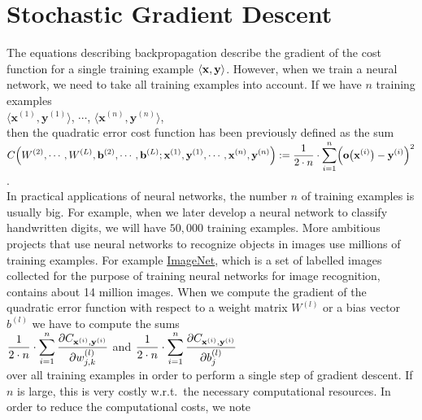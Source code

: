\section{Stochastic Gradient Descent}
The equations describing backpropagation describe the gradient of the cost function for a single training
example $\pair(\mathbf{x}, \mathbf{y})$.  However, when we train a neural network, we need to take all training
examples into account.  If we have $n$ training examples
\\[0.2cm]
\hspace*{1.3cm}
$\langle\mathbf{x}^{(1)}, \mathbf{y}^{(1)}\rangle$,
$\cdots$,
$\langle\mathbf{x}^{(n)}, \mathbf{y}^{(n)}\rangle$,
\\[0.2cm]
then the quadratic error cost function has been previously defined as the sum
\\[0.2cm]
\hspace*{1.3cm}
$\displaystyle C\Bigr(W^{(2)}, \cdots, W^{(L)}, \mathbf{b}^{(2)}, \cdots, \mathbf{b}^{(L)};
     \mathbf{x}^{(1)}, \mathbf{y}^{(1)}, \cdots, \mathbf{x}^{(n)},\mathbf{y}^{(n)} \Bigr) := 
 \frac{1}{2 \cdot n} \cdot \sum\limits_{i=1}^n \Bigl(\mathbf{o}\bigl(\mathbf{x}^{(i)}\bigr) - \mathbf{y}^{(i)}\Bigr)^2
$.
\\[0.2cm]
In practical applications of neural networks, the number $n$ of training examples is usually big.  For example, 
when we later develop a neural network to classify handwritten digits, we will have $50,000$ training examples.  More
ambitious projects that use neural networks to recognize objects in images use millions of training examples.
For example \href{https://www.image-net.org/download.php}{ImageNet}, which is a set of labelled images
collected for the purpose of training neural networks for image recognition, contains about 14 million images.
When we compute the gradient of the quadratic error function with respect to a weight matrix $W^{(l)}$ or a
bias vector $b^{(l)}$ we have to compute the sums 
\\[0.2cm]
\hspace*{0.3cm}
$\displaystyle \frac{1}{2\cdot n} \cdot \sum\limits_{i=1}^n \frac{\partial C_{\mathbf{x}^{(i)}, \mathbf{y}^{(i)}}}{\partial w_{j,k}^{(l)}}$
\quad and \quad
$\displaystyle \frac{1}{2\cdot n} \cdot \sum\limits_{i=1}^n \frac{\partial C_{\mathbf{x}^{(i)}, \mathbf{y}^{(i)}}}{\partial b_{j}^{(l)}}$
\\[0.2cm]
over all training examples in order to perform a single step of gradient descent.  If $n$ is large, this is
very costly w.r.t.~the necessary computational resources.  In order to reduce the computational costs, we note
